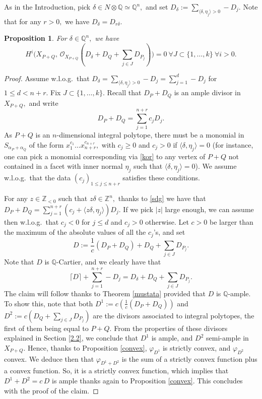 \documentclass[a4paper,11pt]{amsart}
\newcommand{\Q}{\mathbb{Q}}
\newcommand{\Z}{\mathbb{Z}}
\newcommand{\cO}{{\mathcal O}}
\newcounter{thm}
\numberwithin{thm}{section}
\numberwithin{equation}{section}
\theoremstyle{definition}
\theoremstyle{plain}
\newtheorem{proposition}[thm]{Proposition}
\begin{document}
\bigskip
As in the Introduction, pick $\delta\in N\otimes\Q\simeq\Q^n,$ and set
$D_\delta:=\sum_{\langle\delta,\eta_j\rangle>0}-D_j.$ Note that for any $r>0,$ we have $D_{\delta}=D_{r\delta}.$
\begin{proposition}\label{must}
For $\delta\in\Q^n,$  we have
$$H^i\big(X_{P+Q},\,\cO_{X_{P+Q}}(D_\delta+D_Q+\sum_{j\in J}D_{P_j})\big)=0\ \forall J\subset\{1,\ldots, k\} \ \forall i>0.$$
\end{proposition}

\begin{proof}
Assume w.l.o.g.~that $D_\delta=\sum_{\langle\delta,\eta_j\rangle>0}-D_j=\sum_{j=1}^d -D_j$ for $1\leq d< n+r.$
Fix $J\subset\{1,\ldots, k\}.$ Recall that $D_P+D_Q$ is an ample divisor in $X_{P+Q},$
and write
\begin{equation}\label{cj}
D_P+D_Q=\sum_{j=1}^{n+r} c_jD_j.
\end{equation}
As $P+Q$ is an $n$-dimensional integral polytope, there must be a monomial in $S_{\alpha_P+\alpha_Q}$ of the form $x_1^{c_1}\ldots x_{n+r}^{c_{n+r}},$ with $c_j\geq0$ and $c_j>0$ if $\langle \delta,\eta_j\rangle=0$ (for instance, one can  pick a monomial corresponding via \eqref{kor} to any vertex of $P+Q$ not contained in a facet with inner normal $\eta_j$ such that  $\langle \delta, \eta_j \rangle = 0$). We assume w.l.o.g.~that the data $(c_j)_{1\leq j\leq n+r}$ satisfies these conditions.

For any $z\in\Z_{<0}$ such that $z\delta\in\Z^n,$ thanks to \eqref{sdg} we have that  
$D_P+D_Q=\sum_{j=1}^{n+r} (c_j+\langle z\delta, \eta_j\rangle)D_j.$ If we pick $|z|$ large enough, we can assume then w.l.o.g.~that $c_j<0$ for $j\leq d$ and $c_j>0$ otherwise. Let $c>0$ be larger than the maximum of the absolute values of all the $c_j$'s, and set
$$D:=\frac{1}{c}(D_P+D_Q)+D_Q+\sum_{j\in J}D_{P_j}.$$
Note that $D$ is $\Q$-Cartier, and we clearly have that
$$\lceil D\rceil +\sum_{j=1}^{n+r}-D_j= D_\delta+D_Q+\sum_{j\in J}D_{P_j}.
$$
The claim will follow thanks to Theorem \ref{mustata} provided that  $D$  is $\Q$-ample. To show this, note that  both $D^1:=c\left(\frac{1}{c}(D_P+D_Q)\right)$ and $D^2:=c(D_Q+\sum_{j\in J}D_{P_j})$ are the divisors associated to integral polytopes, the first of them being equal to $P+Q.$  From the properties of these divisors explained in Section \ref{2.2}, we conclude that $D^1$ is ample, and $D^2$ semi-ample in $X_{P+Q}.$ Hence, thanks to  Proposition \ref{convex},   $\varphi_{D^1}$ is strictly convex, and $\varphi_{D^2}$ convex. We deduce then that $\varphi_{D^1+D^2}$ is the sum of a strictly convex function plus a  convex function. So, it is a strictly convex function, which  implies that $D^1+D^2=c\,D$ is ample thanks again to Proposition \ref{convex}.
This concludes with the proof of the claim.
\end{proof}
\end{document}
